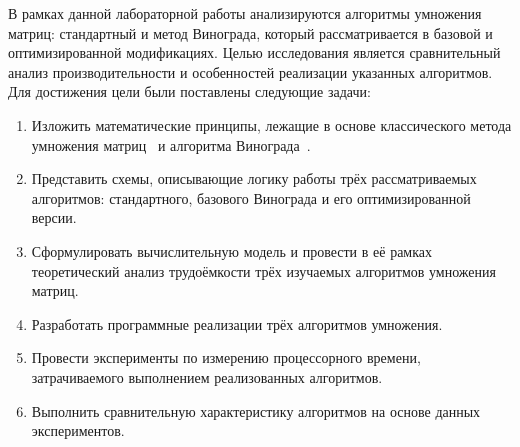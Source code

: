 
В рамках данной лабораторной работы анализируются алгоритмы умножения матриц: стандартный и метод Винограда, который рассматривается в базовой и оптимизированной модификациях.
Целью исследования является сравнительный анализ производительности и особенностей реализации указанных алгоритмов.
Для достижения цели были поставлены следующие задачи:

\begin{enumerate}
	\item Изложить математические принципы, лежащие в основе классического метода умножения матриц~\cite[с.~8]{matrix} и алгоритма Винограда~\cite{vinograd}.
	\item Представить схемы, описывающие логику работы трёх рассматриваемых алгоритмов: стандартного, базового Винограда и его оптимизированной версии.
	\item Сформулировать вычислительную модель и провести в её рамках теоретический анализ трудоёмкости трёх изучаемых алгоритмов умножения матриц.
	\item Разработать программные реализации трёх алгоритмов умножения.
	\item Провести эксперименты по измерению процессорного времени, затрачиваемого выполнением реализованных алгоритмов.
	\item Выполнить сравнительную характеристику алгоритмов на основе данных экспериментов.
\end{enumerate}
\newpage

\clearpage
